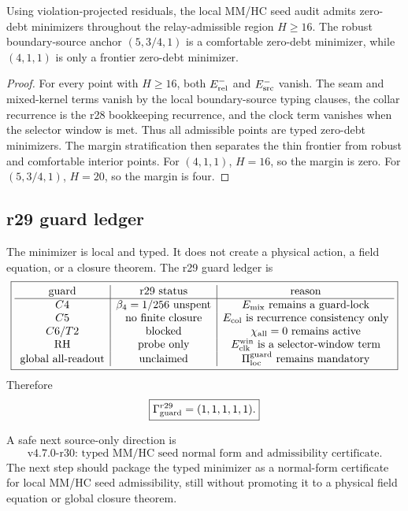 \begin{theoremlet}
\label{thmlet:v470-r29-typed-residual-minimizer}
Using violation-projected residuals, the local MM/HC seed audit admits zero-debt
minimizers throughout the relay-admissible region \(H\geq16\).  The robust
boundary-source anchor \((5,3/4,1)\) is a comfortable zero-debt minimizer, while
\((4,1,1)\) is only a frontier zero-debt minimizer.
\end{theoremlet}

\begin{proof}
For every point with \(H\geq16\), both \(E_{\rm rel}^{-}\) and
\(E_{\rm src}^{-}\) vanish.  The seam and mixed-kernel terms vanish by the local
boundary-source typing clauses, the collar recurrence is the r28 bookkeeping
recurrence, and the clock term vanishes when the selector window is met.  Thus
all admissible points are typed zero-debt minimizers.  The margin stratification
then separates the thin frontier from robust and comfortable interior points.
For \((4,1,1)\), \(H=16\), so the margin is zero.  For \((5,3/4,1)\),
\(H=20\), so the margin is four.
\end{proof}

\subsection{r29 guard ledger}
\label{subsec:v470-r29-guard-ledger}

The minimizer is local and typed.  It does not create a physical action, a field
equation, or a closure theorem.  The r29 guard ledger is
\[
\boxed{
\begin{array}{c|c|c}
\text{guard} & \text{r29 status} & \text{reason}\\
\hline
C4 & \beta_4=1/256\text{ unspent} & E_{\rm mix}\text{ remains a guard-lock}\\
C5 & \text{no finite closure} & E_{\rm col}\text{ is recurrence consistency only}\\
C6/T2 & \text{blocked} & \chi_{\rm all}=0\text{ remains active}\\
\text{RH} & \text{probe only} & E_{\rm clk}^{\rm win}\text{ is a selector-window term}\\
\text{global all-readout} & \text{unclaimed} & \Pi_{\rm loc}^{\rm guard}\text{ remains mandatory}
\end{array}
}
\]
Therefore
\[
\boxed{
\Gamma_{\rm guard}^{r29}=(1,1,1,1,1).
}
\]

A safe next source-only direction is
\[
\boxed{
\text{v4.7.0-r30: typed MM/HC seed normal form and admissibility certificate.}
}
\]
The next step should package the typed minimizer as a normal-form certificate for
local MM/HC seed admissibility, still without promoting it to a physical field
equation or global closure theorem.




